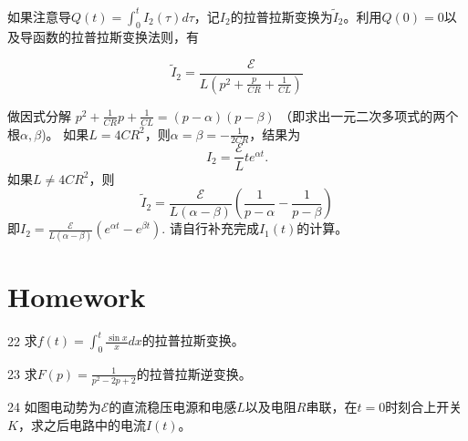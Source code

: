 \documentclass[CJK]{beamer}
\begin{document}
\begin{frame}
  \bch
  如果注意导$Q(t) = \int_0^t I_2(\tau) d\tau$，记$I_2$的拉普拉斯变换为$\tilde{I}_2$。利用$Q(0) = 0$以及导函数的拉普拉斯变换法则，有
  
  $$  \tilde{I}_2 = \frac{\mathcal{E}}{L\left(p^2+\frac{p}{CR} + \frac{1}{CL}\right)} $$

  做因式分解 $p^2 + \frac{1}{CR} p + \frac{1}{CL} = (p-\alpha)(p-\beta)$ （即求出一元二次多项式的两个根$\alpha,\beta$)。
    如果$L = 4CR^2$，则$\alpha = \beta = -\frac{1}{2CR}$，结果为 $$ I_2 = \frac{\mathcal{E}}{L}t e^{\alpha t} .$$
    如果$L \ne 4CR^2$，则
    $$\tilde{I}_2 = \frac{\mathcal{E}}{L(\alpha-\beta)} \left(\frac{1}{p-\alpha}-\frac{1}{p-\beta}\right) $$
    即$I_2 = \frac{\mathcal{E}}{L(\alpha-\beta)}\left(e^{\alpha t}- e^{\beta t}\right).$
    {\scriptsize   请自行补充完成$I_1(t)$的计算。}
  \ech
\end{frame}



\section{Homework}

\begin{frame}
\bch
\bitem
\item[22]{求$f(t) = \int_0^t \frac{\sin x}{x}dx$的拉普拉斯变换。}
\item[23]{求$F(p) = \frac{1}{p^2-2p+2}$的拉普拉斯逆变换。}
\item[24]{如图电动势为$\mathcal{E}$的直流稳压电源和电感$L$以及电阻$R$串联，在$t=0$时刻合上开关$K$，求之后电路中的电流$I(t)$。
}
  \eitem
\ech
\end{frame}
\end{document}
